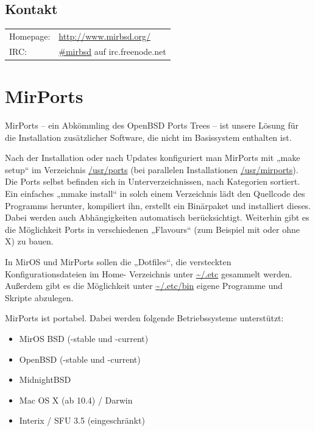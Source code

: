 \documentclass[a4paper,landscape,11pt,notumble]{leaflet}
\begin{document}
\subsection{Kontakt}
{\large
\begin{tabular}{ll}
Homepage: & \textcolor{darkred}{\url{http://www.mirbsd.org/}}\\
IRC: & \textcolor{darkred}{\url{#mirbsd}} auf irc.freenode.net\\
\end{tabular}
\par}
\vspace{3ex}%
\graybox

\newpage

\section{MirPorts}

MirPorts -- ein Abkömmling des OpenBSD Ports Trees -- ist unsere Lösung für die Installation zusätzlicher Software, die nicht im Basissystem enthalten ist.

Nach der Installation oder nach Updates konfiguriert man MirPorts mit „make setup“ im Verzeichnis \url{/usr/ports} (bei parallelen Installationen \url{/usr/mirports}). Die Ports selbst befinden sich in Unterverzeichnissen, nach Kategorien sortiert. Ein einfaches „mmake install“ in solch einem Verzeichnis lädt den Quellcode des Programms herunter, kompiliert ihn, erstellt ein Binärpaket und installiert dieses. Dabei werden auch Abhängigkeiten automatisch berücksichtigt. Weiterhin gibt es die Möglichkeit Ports in verschiedenen „Flavours“ (zum Beispiel mit oder ohne X) zu bauen.

In MirOS und MirPorts sollen die „Dotfiles“, die versteckten Konfigurationsdateien im Home- Verzeichnis unter \url{~/.etc} gesammelt werden. Außerdem gibt es die Möglichkeit unter \url{~/.etc/bin} eigene Programme und Skripte abzulegen.

MirPorts ist portabel. Dabei werden folgende Betriebssysteme unterstützt:

\begin{itemize}
\item MirOS BSD (-stable und -current)
\item OpenBSD (-stable und -current)
\item MidnightBSD
\item Mac OS X (ab 10.4) / Darwin
\item Interix / SFU 3.5 (eingeschränkt)
\end{itemize}
\end{document}
